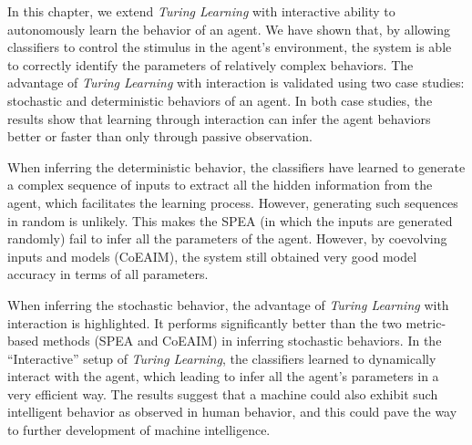 In this chapter, we extend \textit{Turing Learning} with interactive ability to autonomously learn the behavior of an agent. We have shown that, by allowing classifiers to control the stimulus in the agent's environment, the system is able to correctly identify the parameters of relatively complex behaviors. The advantage of \textit{Turing Learning} with interaction is validated using two case studies: stochastic and deterministic behaviors of an agent. In both case studies, the results show that learning through interaction can infer the agent behaviors better or faster than only through passive observation. 

When inferring the deterministic behavior, the classifiers have learned to generate a complex sequence of inputs to extract all the hidden information from the agent, which facilitates the learning process. However, generating such sequences in random is unlikely. This makes the SPEA (in which the inputs are generated randomly) fail to infer all the parameters of the agent. However, by coevolving inputs and models (CoEAIM), the system still obtained very good model accuracy in terms of all parameters. 

When inferring the stochastic behavior, the advantage of \textit{Turing Learning} with interaction is highlighted. 
It performs significantly better than the two metric-based methods (SPEA and CoEAIM) in inferring stochastic behaviors. In the ``Interactive'' setup of \textit{Turing Learning}, the classifiers learned to dynamically interact with the agent, which leading to infer all the agent's parameters in a very efficient way. The results suggest that a machine could also exhibit such intelligent behavior as observed in human behavior, and this could pave the way to further development of machine intelligence. 



